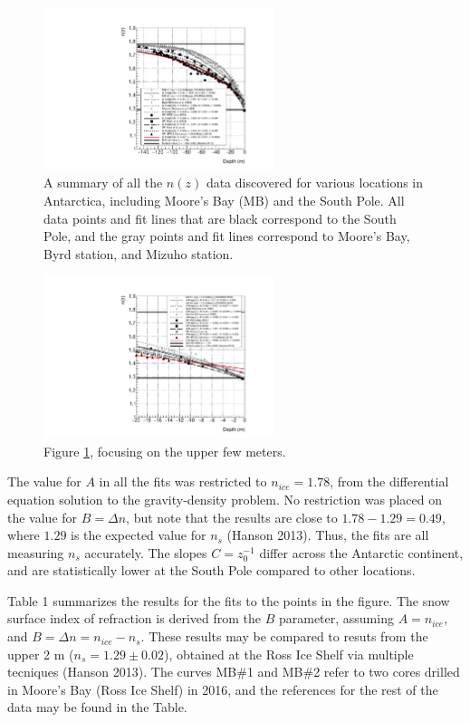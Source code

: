 \documentclass[12pt]{article}
\begin{document}
\begin{figure}[ht]
\centering
\includegraphics[width=0.6\textwidth]{figures/April21_plot1.pdf}
\caption{\label{fig:fig1} A summary of all the $n(z)$ data discovered for various locations in Antarctica, including Moore's Bay (MB) and the South Pole.  All data points and fit lines that are black correspond to the South Pole, and the gray points and fit lines correspond to Moore's Bay, Byrd station, and Mizuho station.}
\end{figure}

\begin{figure}[ht]
\centering
\includegraphics[width=0.6\textwidth]{figures/April21_plot2.pdf}
\caption{\label{fig:fig1a} Figure \ref{fig:fig1}, focusing on the upper few meters.}
\end{figure}

The value for $A$ in all the fits was restricted to $n_{ice} = 1.78$, from the differential equation solution to the gravity-density problem.  No restriction was placed on the value for $B=\Delta n$, but note that the results are close to $1.78-1.29 = 0.49$, where $1.29$ is the expected value for $n_s$ (Hanson 2013).  Thus, the fits are all measuring $n_s$ accurately.  The slopes $C = z_0^{-1}$ differ across the Antarctic continent, and are statistically lower at the South Pole compared to other locations.

Table 1 summarizes the results for the fits to the points in the figure.  The snow surface index of refraction is derived from the $B$ parameter, assuming $A = n_{ice}$, and $B = \Delta n = n_{ice} - n_s$.  These results may be compared to resuts from the upper 2 m ($n_s = 1.29\pm0.02$), obtained at the Ross Ice Shelf via multiple tecniques (Hanson 2013).  The curves MB\#1 and MB\#2 refer to two cores drilled in Moore's Bay (Ross Ice Shelf) in 2016, and the references for the rest of the data may be found in the Table.
\end{document}
